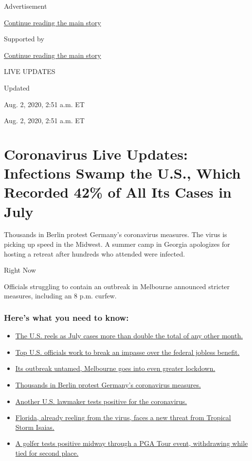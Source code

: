 Advertisement

\protect\hyperlink{after-top}{Continue reading the main story}

Supported by

\protect\hyperlink{after-sponsor}{Continue reading the main story}

LIVE UPDATES

Updated~

Aug. 2, 2020, 2:51 a.m. ET

Aug. 2, 2020, 2:51 a.m. ET

\hypertarget{coronavirus-live-updates-infections-swamp-the-us-which-recorded-42-of-all-its-cases-in-july-}{%
\section{Coronavirus Live Updates: Infections Swamp the U.S., Which
Recorded 42\% of All Its Cases in July
}\label{coronavirus-live-updates-infections-swamp-the-us-which-recorded-42-of-all-its-cases-in-july-}}

Thousands in Berlin protest Germany's coronavirus measures. The virus is
picking up speed in the Midwest. A summer camp in Georgia apologizes for
hosting a retreat after hundreds who attended were infected.

Right Now

Officials struggling to contain an outbreak in Melbourne announced
stricter measures, including an 8 p.m. curfew.

\hypertarget{heres-what-you-need-to-know}{%
\subsubsection{Here's what you need to
know:}\label{heres-what-you-need-to-know}}

\begin{itemize}
\tightlist
\item
  \protect\hyperlink{link-34047410}{The U.S. reels as July cases more
  than double the total of any other month.}
\item
  \protect\hyperlink{link-780ec966}{Top U.S. officials work to break an
  impasse over the federal jobless benefit.}
\item
  \protect\hyperlink{link-2bc8948}{Its outbreak untamed, Melbourne goes
  into even greater lockdown.}
\item
  \protect\hyperlink{link-25930521}{Thousands in Berlin protest
  Germany's coronavirus measures.}
\item
  \protect\hyperlink{link-71e54361}{Another U.S. lawmaker tests positive
  for the coronavirus.}
\item
  \protect\hyperlink{link-1e0cb5f3}{Florida, already reeling from the
  virus, faces a new threat from Tropical Storm Isaias.}
\item
  \protect\hyperlink{link-45c905e3}{A golfer tests positive midway
  through a PGA Tour event, withdrawing while tied for second place.}
\end{itemize}

